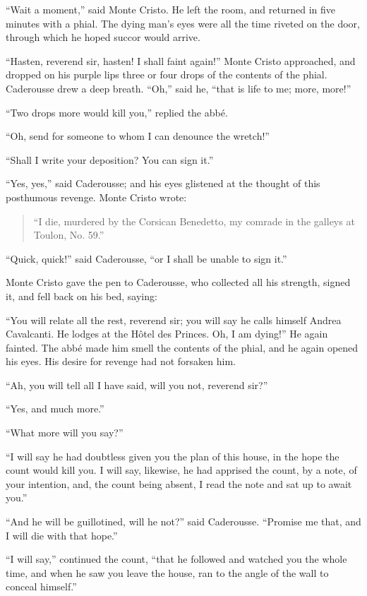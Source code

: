 “Wait a moment,” said Monte Cristo. He left the room, and returned in
five minutes with a phial. The dying man’s eyes were all the time
riveted on the door, through which he hoped succor would arrive.

“Hasten, reverend sir, hasten! I shall faint again!” Monte Cristo
approached, and dropped on his purple lips three or four drops of the
contents of the phial. Caderousse drew a deep breath. “Oh,” said he,
“that is life to me; more, more!”

“Two drops more would kill you,” replied the abbé.

“Oh, send for someone to whom I can denounce the wretch!”

“Shall I write your deposition? You can sign it.”

“Yes, yes,” said Caderousse; and his eyes glistened at the thought of
this posthumous revenge. Monte Cristo wrote:

\begin{quote}
{\small“I die, murdered by the Corsican Benedetto, my comrade in the galleys
at Toulon, No. 59.”}
\end{quote}

“Quick, quick!” said Caderousse, “or I shall be unable to sign it.”

Monte Cristo gave the pen to Caderousse, who collected all his
strength, signed it, and fell back on his bed, saying:

“You will relate all the rest, reverend sir; you will say he calls
himself Andrea Cavalcanti. He lodges at the Hôtel des Princes. Oh, I am
dying!” He again fainted. The abbé made him smell the contents of the
phial, and he again opened his eyes. His desire for revenge had not
forsaken him.

“Ah, you will tell all I have said, will you not, reverend sir?”

“Yes, and much more.”

“What more will you say?”

“I will say he had doubtless given you the plan of this house, in the
hope the count would kill you. I will say, likewise, he had apprised
the count, by a note, of your intention, and, the count being absent, I
read the note and sat up to await you.”

“And he will be guillotined, will he not?” said Caderousse. “Promise me
that, and I will die with that hope.”

“I will say,” continued the count, “that he followed and watched you
the whole time, and when he saw you leave the house, ran to the angle
of the wall to conceal himself.”

